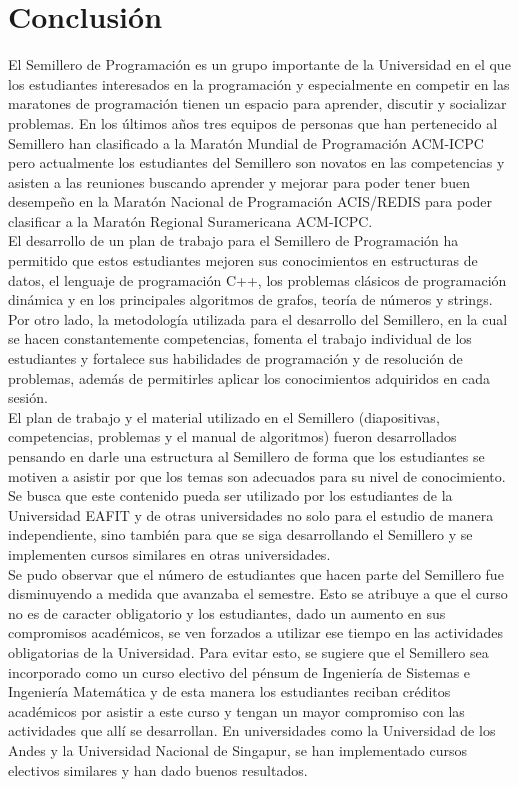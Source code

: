 \documentclass[conference]{IEEEtran}
\begin{document}
\section{Conclusión}
El Semillero de Programación es un grupo importante de la Universidad en el que los estudiantes interesados en la programación y especialmente en competir en las maratones de programación tienen un espacio para aprender, discutir y socializar problemas. En los últimos años tres equipos de personas que han pertenecido al Semillero han clasificado a la Maratón Mundial de Programación ACM-ICPC pero actualmente los estudiantes del Semillero son novatos en las competencias y asisten a las reuniones buscando aprender y mejorar para poder tener buen desempeño en la Maratón Nacional de Programación ACIS/REDIS para poder clasificar a la Maratón Regional Suramericana ACM-ICPC.\\
El desarrollo de un plan de trabajo para el Semillero de Programación ha permitido que estos estudiantes mejoren sus conocimientos en estructuras de datos, el lenguaje de programación C++, los problemas clásicos de programación dinámica y en los principales algoritmos de grafos, teoría de números y strings. Por otro lado, la metodología utilizada para el desarrollo del Semillero, en la cual se hacen constantemente competencias, fomenta el trabajo individual de los estudiantes y fortalece sus habilidades de programación y de resolución de problemas, además de permitirles aplicar los conocimientos adquiridos en cada sesión.\\
El plan de trabajo y el material utilizado en el Semillero (diapositivas, competencias, problemas y el manual de algoritmos) fueron desarrollados pensando en darle una estructura al Semillero de forma que los estudiantes se motiven a asistir por que los temas son adecuados para su nivel de conocimiento. Se busca que este contenido pueda ser utilizado por los estudiantes de la Universidad EAFIT y de otras universidades no solo para el estudio de manera independiente, sino también para que se siga desarrollando el Semillero y se implementen cursos similares en otras universidades.\\
Se pudo observar que el número de estudiantes que hacen parte del Semillero fue disminuyendo a medida que avanzaba el semestre. Esto se atribuye a que el curso no es de caracter obligatorio y los estudiantes, dado un aumento en sus compromisos académicos, se ven forzados a utilizar ese tiempo en las actividades obligatorias de la Universidad. Para evitar esto, se sugiere que el Semillero sea incorporado como un curso electivo del pénsum de Ingeniería de Sistemas e Ingeniería Matemática y de esta manera los estudiantes reciban créditos académicos por asistir a este curso y tengan un mayor compromiso con las actividades que allí se desarrollan. En universidades como la Universidad de los Andes y la Universidad Nacional de Singapur, se han implementado cursos electivos similares y han dado buenos resultados.\\
\end{document}
